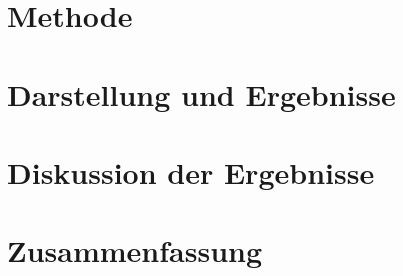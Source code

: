 \section{Methode} %



\newpage


\section{Darstellung und Ergebnisse} %



\newpage


\section{Diskussion der Ergebnisse} %



\newpage


\section{Zusammenfassung} %



\newpage

\begin{thebibliography}{9} %







 
\end{thebibliography}


